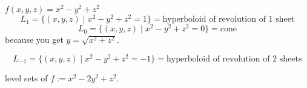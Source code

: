 \documentclass[12pt]{book}
\theoremstyle{definition}
\theoremstyle{remark}
\begin{document}
\begin{example}[iii]
  $f(x,y,z) = x^2 -y^2 +z^2$
  $$L_1 =  \{ (x,y,z) \mid x^2 - y^2 + z^2 = 1 \} =\text{hyperboloid of revolution of 1 sheet} $$ 
   $$L_0 =  \{ (x,y,z) \mid x^2 - y^2 + z^2 = 0 \} = \text{cone} $$
   because you get $y = \sqrt{x^2 + z^2}$.
  \newline
   $$L_{-1} =  \{ (x,y,z) \mid x^2 - y^2 + z^2 = -1 \} =\text{hyperboloid of revolution of 2 sheets} $$ 
\end{example}
\begin{example}[iv]
  level sets of $f:= x^2 -2y^2 +z^2$. 
\end{example}
\end{document}
